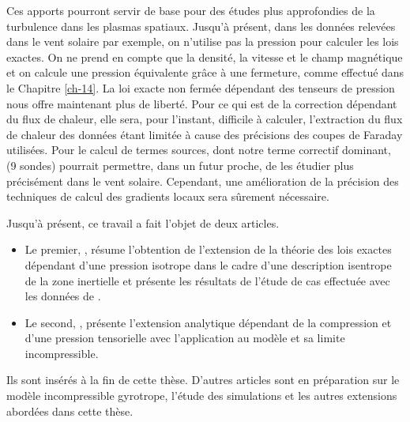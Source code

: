 Ces apports pourront servir de base pour des études plus approfondies de la turbulence dans les plasmas spatiaux. Jusqu'à présent, dans les données relevées dans le vent solaire par exemple, on n'utilise pas la pression pour calculer les lois exactes. On ne prend en compte que la densité, la vitesse et le champ magnétique et on calcule une pression équivalente grâce à une fermeture, comme effectué dans le Chapitre \ref{ch-14}. La loi exacte non fermée dépendant des tenseurs de pression nous offre maintenant plus de liberté. Pour ce qui est de la correction dépendant du flux de chaleur, elle sera, pour l'instant, difficile à calculer, l'extraction du flux de chaleur des données étant limitée à cause des précisions des coupes de Faraday utilisées. Pour le calcul de termes sources, dont notre terme correctif dominant,  (9 sondes) pourrait permettre, dans un futur proche, de les étudier plus précisément dans le vent solaire. Cependant, une amélioration de la précision des techniques de calcul des gradients locaux sera sûrement nécessaire. 

Jusqu'à présent, ce travail a fait l'objet de deux articles. 
\begin{itemize}
 \item Le premier, \cite{simon_general_2021}, résume l'obtention de l'extension de la théorie des lois exactes dépendant d'une pression isotrope dans le cadre d'une description isentrope de la zone inertielle et présente les résultats de l'étude de cas effectuée avec les données de .
 \item Le second, \cite{simon_exact_2022}, présente l'extension analytique dépendant de la compression et d'une pression tensorielle avec l'application au modèle  et sa limite incompressible.
\end{itemize}
  Ils sont insérés à la fin de cette thèse. D'autres articles sont en préparation sur le modèle incompressible gyrotrope, l'étude des simulations et les autres extensions abordées dans cette thèse.    

